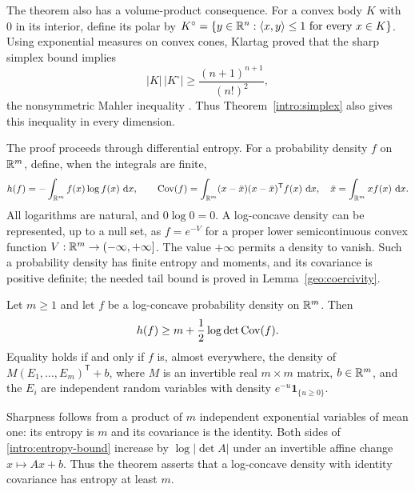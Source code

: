 The theorem also has a volume-product consequence.  For a convex body
$K$ with $0$ in its interior, define its polar by
$K^\circ=\{y\in\mathbb R^n:\langle x,y\rangle\le1\text{ for every }x\in K\}$.
Using exponential measures on convex cones, Klartag proved that the
sharp simplex bound implies
\begin{equation}\label{intro:mahler}
 |K|\,|K^\circ|\ge\frac{(n+1)^{n+1}}{(n!)^2},
\end{equation}
the nonsymmetric Mahler inequality
\cite[Corollary~1.2]{Klartag2018}.  Thus Theorem~\ref{intro:simplex}
also gives this inequality in every dimension.

The proof proceeds through differential entropy.  For a probability
density $f$ on $\mathbb R^m$, define, when the integrals are finite,
\[
 h(f)=-\int_{\mathbb R^m}f(x)\log f(x)\,\,\mathrm d x,
 \qquad
 \operatorname{Cov}(f)=\int_{\mathbb R^m}(x-\bar x)(x-\bar x)^{\mathsf T}f(x)\,\,\mathrm d x,
 \quad \bar x=\int_{\mathbb R^m}xf(x)\,\,\mathrm d x.
\]
All logarithms are natural, and $0\log0=0$.  A log-concave density can
be represented, up to a null set, as $f=e^{-V}$ for a proper lower
semicontinuous convex function $V:\mathbb R^m\to(-\infty,+\infty]$.
The value $+\infty$ permits a density to vanish.  Such a probability
density has finite entropy and moments, and its covariance is positive
definite; the needed tail bound is proved in Lemma~\ref{geo:coercivity}.

\begin{theorem}\label{intro:entropy}
Let $m\ge1$ and let $f$ be a log-concave probability density on $\mathbb R^m$.
Then
\begin{equation}\label{intro:entropy-bound}
 h(f)\ge m+\frac12\log\det\operatorname{Cov}(f).
\end{equation}
Equality holds if and only if $f$ is, almost everywhere, the density
of $M(E_1,\ldots,E_m)^{\mathsf T}+b$, where $M$ is an invertible real
$m\times m$ matrix, $b\in\mathbb R^m$, and the $E_i$ are independent random
variables with density $e^{-u}\mathbf1_{\{u\ge0\}}$.
\end{theorem}

Sharpness follows from a product of $m$ independent exponential variables
of mean one: its entropy is $m$ and its covariance is the identity.
Both sides of \eqref{intro:entropy-bound} increase by $\log|\det A|$
under an invertible affine change $x\mapsto Ax+b$.  Thus the theorem
asserts that a log-concave density with identity covariance has entropy
at least $m$.

